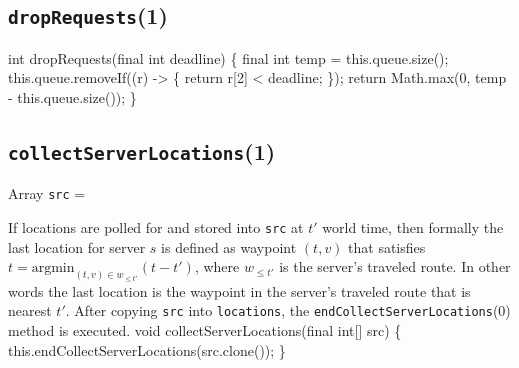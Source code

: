 \subsection{\texttt{dropRequests}(1)}
\nwenddocs{}\endmoddef{}
int dropRequests(final int deadline) \{
  final int temp = this.queue.size();
  this.queue.removeIf((r) -> \{ return r[2] < deadline; \});
  return Math.max(0, temp - this.queue.size());
\}
\eatline
{}\nwendcode{}\nwdocspar
\subsection{\texttt{collectServerLocations}(1)}
Array {\tt{}src} =

\noindent
{}

\noindent If locations are polled for and stored into {\tt{}src} at $t'$ world
time, then formally the last location for server $s$ is defined as waypoint
$(t,v)$ that satisfies $t=\textrm{argmin}_{(t,v)\in w_{\leq t'}} (t-t')$, where
$w_{\leq t'}$ is the server's traveled route.  In other words the last location
is the waypoint in the server's traveled route that is nearest $t'$.  After
copying {\tt{}src} into {\tt{}locations}, the {\tt{}\protect{}endCollectServerLocations}(0) method
is executed.
\nwenddocs{}\endmoddef{}
void collectServerLocations(final int[] src) \{
  this.endCollectServerLocations(src.clone());
\}
\eatline
{}\nwendcode{}\nwdocspar

